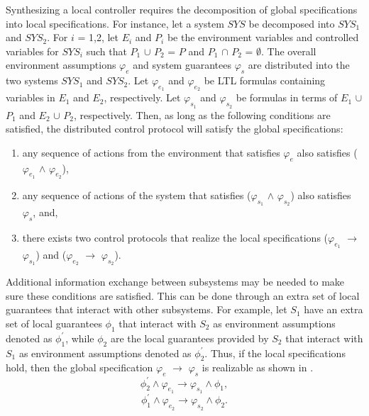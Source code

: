 \documentclass[journal]{IEEEtran}
\begin{document}
Synthesizing a local controller requires the decomposition of global specifications into local specifications. For instance, let a system $SYS$ be decomposed into $SYS_{1}$ and $SYS_{2}$. For $i$ = 1,2, let $E_{i}$ and $P_{i}$ be the environment variables and controlled variables for $SYS_{i}$ such that $P_{1}$ $\cup$ $P_{2}$ = $P$ and $P_{1}$ $\cap$ $P_{2}$ = $\emptyset$. The overall environment assumptions $\varphi_{e}$ and system guarantees $\varphi_{s}$ are distributed into the two systems ${SYS}_{1}$ and ${SYS}_{2}$. Let $\varphi_{e_{1}}$ and $\varphi_{e_{2}}$ be LTL formulas containing variables in $E_{1}$ and $E_{2}$, respectively. Let $\varphi_{s_{1}}$ and $\varphi_{s_{2}}$ be formulas in terms of $E_{1}$ $\cup$ $P_{1}$ and $E_{2}$ $\cup$ $P_{2}$, respectively. Then, as long as the following conditions are satisfied, the distributed control protocol will satisfy the global specifications:
\begin{enumerate}
\item any sequence of actions from the environment that satisfies $\varphi_{e}$ also satisfies ($\varphi_{e_{1}}$ $\land$ $\varphi_{e_{2}}$),
\item any sequence of actions of the system that satisfies ($\varphi_{s_{1}}$ $\land$ $\varphi_{s_{2}}$) also satisfies $\varphi_{s}$, and,
\item there exists two control protocols that realize the local specifications ($\varphi_{e_{1}}$ $\longrightarrow$ $\varphi_{s_{1}}$) and ($\varphi_{e_{2}}$ $\longrightarrow$ $\varphi_{s_{2}}$).
\end{enumerate}
Additional information exchange between subsystems may be needed to make sure these conditions are satisfied. This can be done through an extra set of local guarantees that interact with other subsystems. For example, let $S_{1}$ have an extra set of local guarantees $\phi_{1}$ that interact with $S_{2}$ as environment assumptions denoted as $\phi^\prime_{1}$, while $\phi_{2}$ are the local guarantees provided by $S_{2}$ that interact with $S_{1}$ as environment assumptions denoted as $\phi^\prime_{2}$. Thus, if the local specifications hold, then the global specification $\varphi_{e}$ $\longrightarrow$ $\varphi_{s}$ is realizable as shown in .
\begin{equation}
\phi^\prime_{2} \land \varphi_{e_{1}} \longrightarrow \varphi_{s_{1}} \land \phi_{1}, 
\end{equation}
\begin{equation}
\phi^\prime_{1} \land \varphi_{e_{2}} \longrightarrow \varphi_{s_{2}} \land \phi_{2}.
\end{equation}
\end{document}
